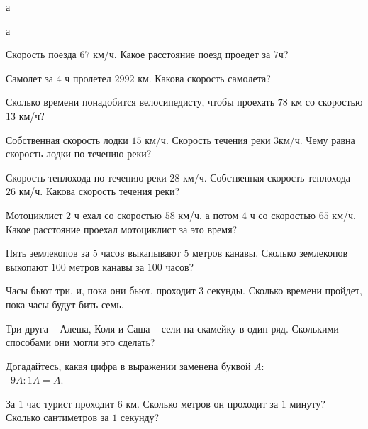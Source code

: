 \begin{class}[number=7]
	\begin{listofex}
		\item а
	\end{listofex}
\end{class}

\begin{exam}
	\begin{listofex}
		\item а
	\end{listofex}
\end{exam}

\begin{consultation}
	\begin{listofex}
		\item Скорость поезда \( 67 \) км/ч. Какое расстояние поезд проедет за \( 7 \)ч?
		\item Самолет за \( 4 \) ч пролетел \( 2992 \) км. Какова скорость самолета?
		\item Сколько времени понадобится велосипедисту, чтобы проехать \( 78 \) км со скоростью \( 13 \) км/ч?
		\item Собственная скорость лодки \( 15 \) км/ч. Скорость течения реки \( 3 \)км/ч. Чему равна скорость лодки по течению реки?
		\item Скорость теплохода по течению реки \( 28 \) км/ч. Собственная скорость теплохода \( 26 \) км/ч. Какова скорость течения реки?
		\item Мотоциклист \( 2 \) ч ехал со скоростью \( 58 \) км/ч, а потом \( 4 \) ч со скоростью \( 65 \) км/ч. Какое расстояние проехал мотоциклист за это время?
		\item Пять землекопов за \( 5 \) часов выкапывают \( 5 \) метров канавы. Сколько землекопов выкопают \( 100 \) метров канавы за \( 100 \) часов?
		\item Часы бьют три, и, пока они бьют, проходит \( 3 \) секунды. Сколько времени пройдет, пока часы будут бить семь.
		\item Три друга – Алеша, Коля и Саша – сели на скамейку в один ряд. Сколькими способами они могли это сделать?
		\item Догадайтесь, какая цифра в выражении заменена буквой \( A \):\\\ \( 9A : 1A = A \).
		\item За \( 1 \) час турист проходит \( 6 \) км. Сколько метров он проходит за \( 1 \) минуту? Сколько сантиметров за \( 1 \) секунду?

\end{listofex}
\end{consultation}
